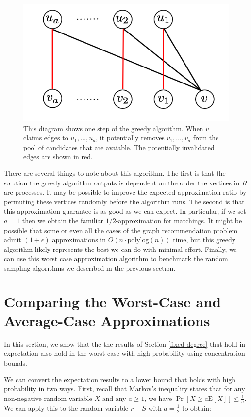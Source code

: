 \documentclass[]{article}
\newcommand{\E}{\text{E}}
\begin{document}
\begin{figure}[h]
\centering
\includegraphics[width=.5\textwidth]{greedy.png}
\begin{minipage}[h]{.8\linewidth}
\caption{This diagram shows one step of the greedy algorithm. When $v$ claims edges to $u_1,\ldots, u_a$, it potentially removes $v_1,\ldots, v_a$ from the pool of candidates that are avaiable. The potentially invalidated edges are shown in red.}
\end{minipage}
\end{figure}

There are several things to note about this algorithm. The first is
that the solution the greedy algorithm outputs is dependent on the
order the vertices in $R$ are processes. It may be possible to improve
the expected approximation ratio by permuting these vertices randomly
before the algorithm runs. The second is that this approximation
guarantee is as good as we can expect. In particular, if we set $a=1$
then we obtain the familiar $1/2$-approximation for matchings. It
might be possible that some or even all the cases of the graph
recommendation problem admit $(1+\epsilon)$ approximations in
$O(n\cdot \text{polylog}(n))$ time, but this greedy algorithm likely
represents the best we can do with minimal effort. Finally, we can use
this worst case approximation algorithm to benchmark the random
sampling algorithms we described in the previous section.

\section{Comparing the Worst-Case and Average-Case Approximations}
In this section, we show that the the results of Section
\ref{fixed-degree} that hold in expectation also hold in the worst
case with high probability using concentration bounds.

We can convert the expectation results to a lower bound that holds
with high probability in two ways. First, recall that Markov's
inequality states that for any non-negative random variable $X$ and
any $a\geq 1$, we have $\Pr[X \geq a\E[X]] \leq \frac{1}{a}$. We can
apply this to the random variable $r-S$ with $a=\frac{1}{2}$ to
obtain:
\end{document}

